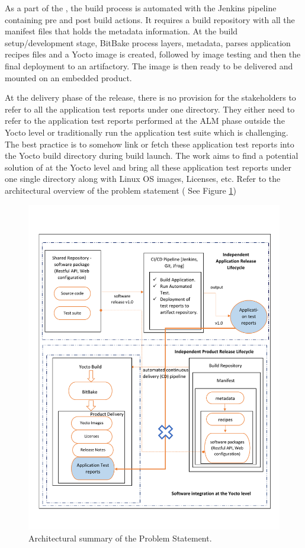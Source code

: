 As a part of the , the build process is automated with the Jenkins pipeline containing pre and post build actions. It requires a build repository with all the manifest files that holds the metadata information. At the build setup/development stage, BitBake process layers, metadata, parses application recipes files and a Yocto image is created, followed by image testing and then the final deployment to an artifactory. The image is then ready to be delivered and mounted on an embedded product.


At the delivery phase of the release, there is no provision for the stakeholders to refer to all the application test reports under one directory. They either need to refer to the application test reports performed at the \ac{ALM} phase outside the Yocto level or traditionally run the application test suite which is challenging. The best practice is to somehow link or fetch these application test reports into the Yocto build directory during build launch. The work aims to find a potential solution of  at the Yocto level and bring all these application test reports under one single directory along with Linux \ac{OS} images, Licenses, etc. Refer to the architectural overview of the problem statement ( See Figure \ref{fig:Architectural summary of the Problem Statement}) 



\begin{figure}
\centering
\includegraphics[scale=0.7]{figures/ThesisYocto.pdf}
\caption[Architectural summary of the Problem Statement]{Architectural summary of the Problem Statement.}
\label{fig:Architectural summary of the Problem Statement}
\end{figure}


